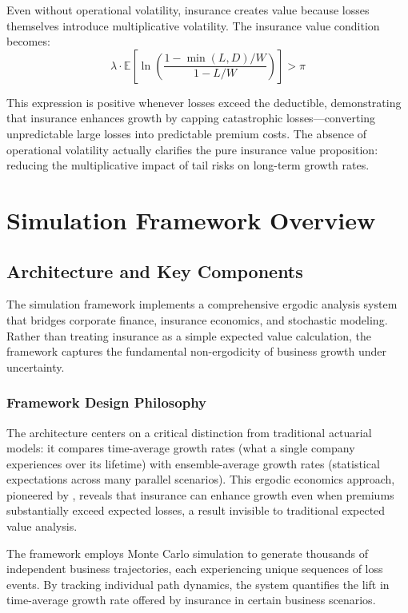 \documentclass[11pt,letterpaper]{article}
\newcommand{\E}{\mathbb{E}}
\begin{document}
Even without operational volatility, insurance creates value because losses themselves introduce multiplicative volatility. The insurance value condition becomes:
\begin{equation}
\lambda \cdot \E\left[\ln\left(\frac{1 - \min(L,D)/W}{1 - L/W}\right)\right] > \pi
\end{equation}

This expression is positive whenever losses exceed the deductible, demonstrating that insurance enhances growth by capping catastrophic losses—converting unpredictable large losses into predictable premium costs. The absence of operational volatility actually clarifies the pure insurance value proposition: reducing the multiplicative impact of tail risks on long-term growth rates.

\section{Simulation Framework Overview}

\subsection{Architecture and Key Components}

The simulation framework implements a comprehensive ergodic analysis system that bridges corporate finance, insurance economics, and stochastic modeling. Rather than treating insurance as a simple expected value calculation, the framework captures the fundamental non-ergodicity of business growth under uncertainty.

\subsubsection{Framework Design Philosophy}

The architecture centers on a critical distinction from traditional actuarial models: it compares time-average growth rates (what a single company experiences over its lifetime) with ensemble-average growth rates (statistical expectations across many parallel scenarios). This ergodic economics approach, pioneered by \citet{peters2019ergodicity}, reveals that insurance can enhance growth even when premiums substantially exceed expected losses, a result invisible to traditional expected value analysis.

The framework employs Monte Carlo simulation to generate thousands of independent business trajectories, each experiencing unique sequences of loss events. By tracking individual path dynamics, the system quantifies the lift in time-average growth rate offered by insurance in certain business scenarios.
\end{document}
